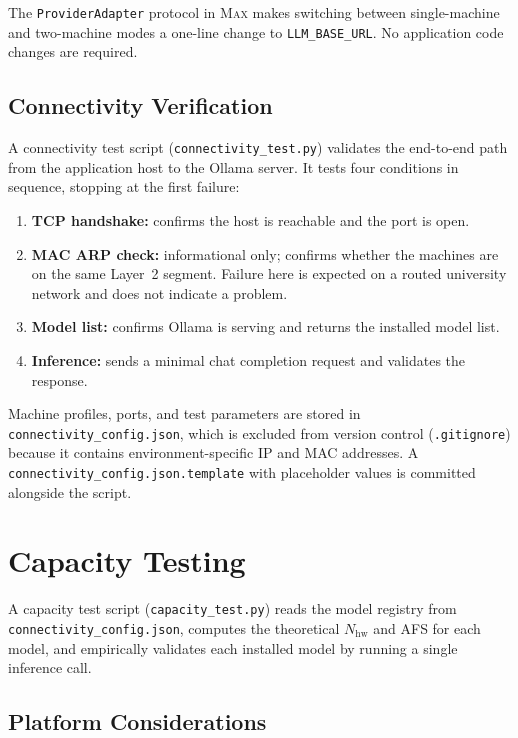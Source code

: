 The \texttt{ProviderAdapter} protocol in \textsc{Max} makes switching
between single-machine and two-machine modes a one-line change to
\texttt{LLM\_BASE\_URL}. No application code changes are required.

\subsection{Connectivity Verification}

A connectivity test script (\texttt{connectivity\_test.py}) validates the
end-to-end path from the application host to the Ollama server. It tests
four conditions in sequence, stopping at the first failure:

\begin{enumerate}
  \item \textbf{TCP handshake:} confirms the host is reachable and the
        port is open.
  \item \textbf{MAC ARP check:} informational only; confirms whether the
        machines are on the same Layer~2 segment. Failure here is expected
        on a routed university network and does not indicate a problem.
  \item \textbf{Model list:} confirms Ollama is serving and returns the
        installed model list.
  \item \textbf{Inference:} sends a minimal chat completion request and
        validates the response.
\end{enumerate}

Machine profiles, ports, and test parameters are stored in
\texttt{connectivity\_config.json}, which is excluded from version control
(\texttt{.gitignore}) because it contains environment-specific IP and MAC
addresses. A \texttt{connectivity\_config.json.template} with placeholder
values is committed alongside the script.

\section{Capacity Testing}
\label{sec:capacity}

A capacity test script (\texttt{capacity\_test.py}) reads the model
registry from \\
\texttt{connectivity\_config.json}, computes the
theoretical $N_{\text{hw}}$ and AFS for each model, and empirically
validates each installed model by running a single inference call.

\subsection{Platform Considerations}

